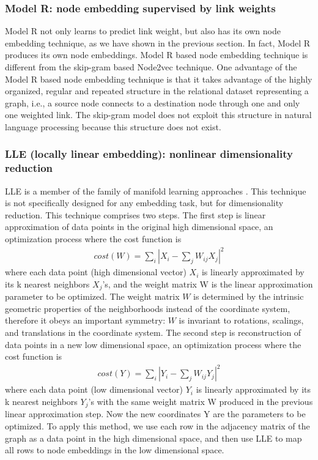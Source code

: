 \documentclass[12pt]{WSUThesis}
\theoremstyle{definition}
\begin{document}
\subsubsection{Model R: node embedding supervised by link weights}
Model R not only learns to predict link weight,
but also has its own node embedding technique,
as we have shown in the previous section.
In fact, Model R produces its own node embeddings.
Model R based node embedding technique is different from the skip-gram based Node2vec technique.
One advantage of the Model R based node embedding technique is that it takes advantage of the highly organized, regular and repeated structure in the relational dataset representing a graph, i.e., a source node connects to a destination node through one and only one weighted link.
The skip-gram model does not exploit this structure in natural language processing because this structure does not exist.

\subsubsection{LLE (locally linear embedding): nonlinear dimensionality reduction}
LLE is a member of the family of manifold learning approaches \citep{roweis2000nonlinear}.
This technique is not specifically designed for any embedding task, but for dimensionality reduction.
This technique comprises two steps.
The first step is linear approximation of data points in the original high dimensional space, an optimization process where the cost function is
\begin{align*}
cost(W) = \sum_i |X_i - \sum_jW_{ij}X_j|^2
\end{align*}
where each data point (high dimensional vector) $ X_i $ is linearly approximated by its k nearest neighbors $ X_j $'s, and the weight matrix W is the linear approximation parameter to be optimized.
The weight matrix $ W $ is determined by the intrinsic geometric properties of the neighborhoods instead of the coordinate system, therefore it obeys an important symmetry: $ W $ is invariant to rotations, scalings, and translations in the coordinate system.
The second step is reconstruction of data points in a new low dimensional space, an optimization process where the cost function is
\begin{align*}
cost(Y) = \sum_i |Y_i - \sum_jW_{ij}Y_j|^2
\end{align*}
where each data point (low dimensional vector) $ Y_i $ is linearly approximated by its k nearest neighbors $ Y_j $'s with the same weight matrix W produced in the previous linear approximation step. Now the new coordinates Y are the parameters to be optimized.
To apply this method, we use each row in the adjacency matrix of the graph as a data point in the high dimensional space, and then use LLE to map all rows to node embeddings in the low dimensional space.
\end{document}
